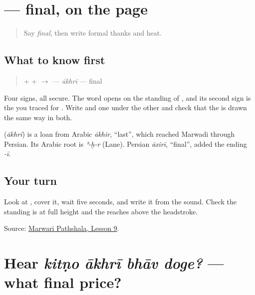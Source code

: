 \section[\texorpdfstring{\mw{आखरी} (ākhrī)}{आखरी (ākhrī)}]{ — final, on the page}

\label{lesson:MW-C24-aakhri}



\begin{quote}
Say \emph{final}, then write formal thanks and heat.
\end{quote}

\subsection*{What to know first}
\begin{quote}
\textbf{} + \textbf{} + \textbf{} $\to$ \textbf{} — \emph{ākhrī} — final
\end{quote}

Four signs, all secure. The word opens on the standing \textbf{} of \textbf{}, and its second sign is the \textbf{} you traced for \textbf{}. Write \textbf{} and \textbf{} one under the other and check that the \textbf{} is drawn the same way in both.

\begin{cousinweb}
\textbf{} (\emph{ākhrī}) is a loan from Arabic \emph{ākhir}, \textquotedblleft{}last\textquotedblright{}, which reached Marwadi through Persian. Its Arabic root is \emph{ʾ-ḫ-r} (Lane). Persian \emph{āxirī}, \textquotedblleft{}final\textquotedblright{}, added the ending \emph{-ī}.
\end{cousinweb}

\subsection*{Your turn}
Look at \textbf{}, cover it, wait five seconds, and write it from the sound. Check the standing \textbf{} is at full height and the \textbf{} reaches above the headstroke.

\begin{tcolorbox}[breakable,colback=teal!4,colframe=teal!35!black,title={Before you move on}]
Source: \href{https://www.marwaripathshala.com/marwari-lesson-9-english}{Marwari Pathshala, Lesson 9}.
\end{tcolorbox}
\section[kitṇo ākhrī bhāv doge?]{Hear \emph{kitṇo ākhrī bhāv doge?} — what final price?}

